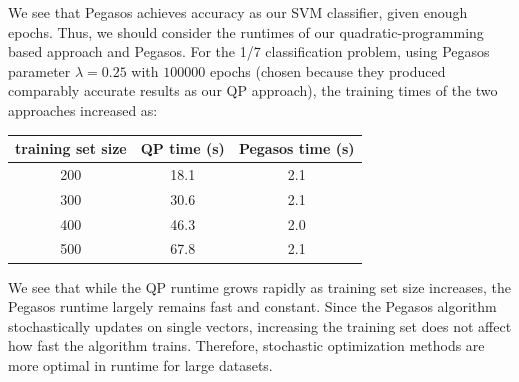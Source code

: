 \documentclass{article}
\begin{document}
\begin{multicols}{2}
We see that Pegasos achieves accuracy as our SVM classifier, given enough epochs.
Thus, we should consider the runtimes of
our quadratic-programming based approach and Pegasos.
For the 1/7 classification problem,
using Pegasos parameter $\lambda = 0.25$ with $100 000$ epochs
(chosen because they produced comparably accurate results as our QP approach),
the training times of the two approaches increased as:
\begin{center}
    \begin{tabular}{|c|c|c|}\hline
        training set size & QP time (s) & Pegasos time (s) \\\hline
        200 & 18.1 & 2.1\\
        300 & 30.6 & 2.1\\
        400 & 46.3 & 2.0\\
        500 & 67.8 & 2.1\\\hline
    \end{tabular}
\end{center}

We see that while the QP runtime grows rapidly as training set size increases, the 
Pegasos runtime largely remains fast and constant. Since the Pegasos algorithm stochastically 
updates on single vectors, increasing the training set does not affect how fast the algorithm 
trains. Therefore, stochastic optimization methods are more optimal in runtime for
large datasets.

\end{multicols}
\end{document}
